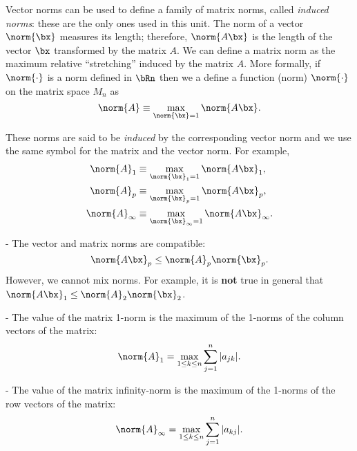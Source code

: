 \smallskip

Vector norms can be used to define a family of matrix norms, called
\textit{induced norms}: these are the only ones used in this unit. The norm
of a vector $\norm{ \bx }$ measures its length; therefore, $\norm{ A \bx }$
is the length of the vector $\bx$ transformed by the matrix $A$.  We
can define a matrix norm as the maximum relative ``stretching''
induced by the matrix $A$.  More formally, if $\norm{ \cdot }$ is a norm
defined in $\bRn$ then we a define a function (norm) $\norm{ \cdot }$ on
the matrix space $M_n$ as
%
\begin{equation*}
\norm{ A } \equiv \max_{\norm{ \bx } = 1} \norm{ A \bx } .
\end{equation*}


\smallskip

These norms are said to be \textit{induced} by the corresponding
vector norm and we use the same symbol for the matrix and the vector
norm.   For example, 
%
\begin{align*}
  \norm{ A }_1 & \equiv \max_{\norm{ \bx }_1 = 1} \norm{ A \bx }_1 , \\
  \norm{ A }_p & \equiv \max_{\norm{ \bx }_p = 1} \norm{ A \bx }_p , \\
  \norm{ A }_\infty & \equiv \max_{\norm{ \bx }_\infty = 1} \norm{ A \bx }_\infty .
\end{align*}
%
\smallskip

 - The vector and matrix norms are compatible:
%
\begin{equation*}
  \norm{ A \bx }_p \le \norm{ A }_p \norm{ \bx }_p .
\end{equation*}
%
However, we cannot mix norms.  For example, it is \textbf{not} true in
general that $\norm{ A \bx }_1 \le \norm{ A }_2 \norm{ \bx }_2$.

\smallskip

 - The value of the matrix 1-norm is the
maximum of the 1-norms of the column vectors of the matrix:
%
\begin{equation*}
 \norm{ A }_1 = \max_{1 \le k \le n} \sum_{j=1}^n | a_{j k} | .
\end{equation*}
%

\smallskip

 - The value of the matrix infinity-norm is
the maximum of the 1-norms of the row vectors of the matrix:
%
\begin{equation*}
  \norm{ A }_\infty = \max_{1 \le k \le n} \sum_{j=1}^n | a_{k j} | .
\end{equation*}

